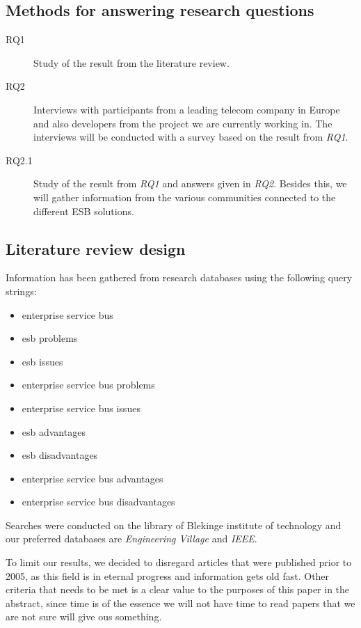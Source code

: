 \documentclass{llncs}
\begin{document}
\subsection{Methods for answering research questions}

\begin{description}
\item[RQ1] Study of the result from the literature review.
\item[RQ2] Interviews with participants from a leading telecom company in Europe and also developers from the project we are currently working in. The interviews will be conducted with a survey based on the result from \emph{RQ1}.
\item[RQ2.1] Study of the result from \emph{RQ1} and answers given in \emph{RQ2}. Besides this, we will gather information from the various communities connected to the different ESB solutions.
\end{description}

\subsection{Literature review design}
Information has been gathered from research databases using the following query strings:
\begin{itemize}
\item enterprise service bus
\item esb problems
\item esb issues
\item enterprise service bus problems
\item enterprise service bus issues
\item esb advantages
\item esb disadvantages
\item enterprise service bus advantages
\item enterprise service bus disadvantages
\end{itemize}

Searches were conducted on the library of Blekinge institute of technology and our preferred databases are \emph{Engineering Village} and \emph{IEEE}.

To limit our results, we decided to disregard articles that were published prior to 2005, as this field is in eternal progress and information gets old fast.
Other criteria that needs to be met is a clear value to the purposes of this paper in the abstract, since time is of the essence we will not have time to read papers that we are not sure will give ous something.
\end{document}
